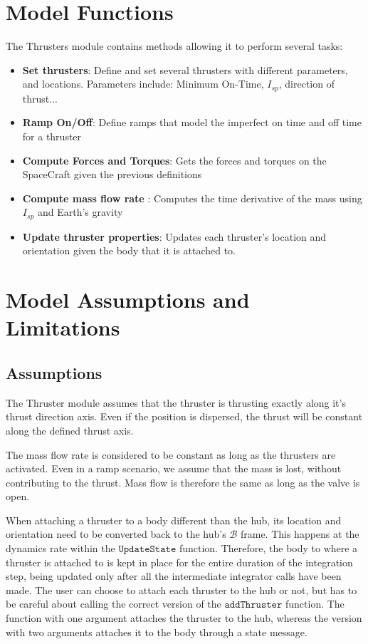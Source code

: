 \section{Model Functions}

The Thrusters module contains methods allowing it to perform several tasks:

\begin{itemize}
	\item \textbf{Set thrusters}: Define and set several thrusters with different parameters, and locations. Parameters include: Minimum On-Time, $I_{sp}$, direction of thrust...
	\item \textbf{Ramp On/Off}: Define ramps that model the imperfect on time and off time for a thruster
	\item \textbf{Compute Forces and Torques}: Gets the forces and torques on the SpaceCraft given the previous definitions
	\item \textbf{Compute mass flow rate }: Computes the time derivative of the mass using $I_{sp}$ and Earth's gravity
	\item \textbf{Update thruster properties}: Updates each thruster's location and orientation given the body that it is attached to.
\end{itemize}




\section{Model Assumptions and Limitations}

\subsection{Assumptions}

The Thruster module assumes that the thruster is thrusting exactly along it's thrust direction axis. Even if the position is dispersed, the thrust will be constant along the defined thrust axis.

The mass flow rate is considered to be constant as long as the thrusters are activated. Even in a ramp scenario, we assume that the mass is lost, without contributing to the thrust. Mass flow is therefore the same as long as the valve is open.

When attaching a thruster to a body different than the hub, its location and orientation need to be converted back to the hub's $\mathcal{B}$ frame. This happens at the dynamics rate within the $\texttt{UpdateState}$ function. Therefore, the body to where a thruster is attached to is kept in place for the entire duration of the integration step, being updated only after all the intermediate integrator calls have been made. The user can choose to attach each thruster to the hub or not, but has to be careful about calling the correct version of the $\texttt{addThruster}$ function. The function with one argument attaches the thruster to the hub, whereas the version with two arguments attaches it to the body through a state message.

